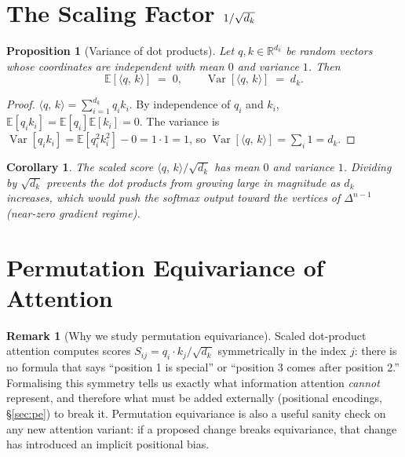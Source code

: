 \documentclass[11pt]{amsart}
\theoremstyle{plain}
\newtheorem{proposition}[theorem]{Proposition}
\newtheorem{corollary}[theorem]{Corollary}
\theoremstyle{definition}
\newtheorem{remark}[theorem]{Remark}
\newcommand{\R}{\mathbb{R}}
\newcommand{\simplex}[1]{\Delta^{#1}}   %
\newcommand{\Var}{\operatorname{Var}}
\newcommand{\inner}[2]{\langle #1,\, #2 \rangle}
\begin{document}
\section{The Scaling Factor $1/\protect\sqrt{d_k}$}
\label{sec:scaling}

\begin{proposition}[Variance of dot products]
\label{prop:variance}
Let $q, k \in \R^{d_k}$ be random vectors whose coordinates are independent
with mean $0$ and variance $1$.  Then
\[
    \mathbb{E}[\inner{q}{k}] \;=\; 0, \qquad
    \Var[\inner{q}{k}] \;=\; d_k.
\]
\end{proposition}
\begin{proof}
$\inner{q}{k} = \sum_{i=1}^{d_k} q_i k_i$.  By independence of $q_i$ and $k_i$,
$\mathbb{E}[q_i k_i] = \mathbb{E}[q_i]\mathbb{E}[k_i] = 0$.  The variance is
$\Var[q_i k_i] = \mathbb{E}[q_i^2 k_i^2] - 0 = 1 \cdot 1 = 1$, so
$\Var[\inner{q}{k}] = \sum_i 1 = d_k$.
\end{proof}

\begin{corollary}
The scaled score $\inner{q}{k}/\sqrt{d_k}$ has mean $0$ and variance $1$.
Dividing by $\sqrt{d_k}$ prevents the dot products from growing large in
magnitude as $d_k$ increases, which would push the softmax output toward the
vertices of $\simplex{n-1}$ (near-zero gradient regime).
\end{corollary}

\section{Permutation Equivariance of Attention}
\label{sec:perm-equivariance}

\begin{remark}[Why we study permutation equivariance]
Scaled dot-product attention computes scores $S_{ij} = q_i \cdot k_j/\sqrt{d_k}$
symmetrically in the index $j$: there is no formula that says ``position 1 is
special'' or ``position 3 comes after position 2.''  Formalising this symmetry
tells us exactly what information attention \emph{cannot} represent, and therefore
what must be added externally (positional encodings, \S\ref{sec:pe}) to break it.
Permutation equivariance is also a useful sanity check on any new attention
variant: if a proposed change breaks equivariance, that change has introduced an
implicit positional bias.
\end{remark}
\end{document}
